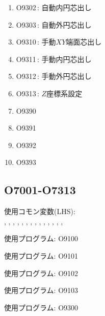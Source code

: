 \begin{enumerate}
\item O9302\,: 自動内円芯出し
\item O9303\,: 自動外円芯出し
\item O9310\,: 手動\texorpdfstring{$XY$}{XY}端面芯出し
\item O9311\,: 手動内円芯出し
\item O9312\,: 手動外円芯出し
\item O9313\,: \texorpdfstring{$Z$}{Z}座標系設定
\item O9390
\item O9391
\item O9392
\item O9393
\end{enumerate}


\clearpage

\subsection{O7001-O7313}
\begin{hosoku}\small
使用コモン変数(LHS):\\
, , , , , , , , , , , , , , 
\end{hosoku}

\begin{hosoku}\small
使用プログラム: O9100
\end{hosoku}

\begin{hosoku}\small
使用プログラム: O9101
\end{hosoku}

\begin{hosoku}\small
使用プログラム: O9102
\end{hosoku}

\begin{hosoku}\small
使用プログラム: O9103
\end{hosoku}

\begin{hosoku}\small
使用プログラム: O9300
\end{hosoku}

